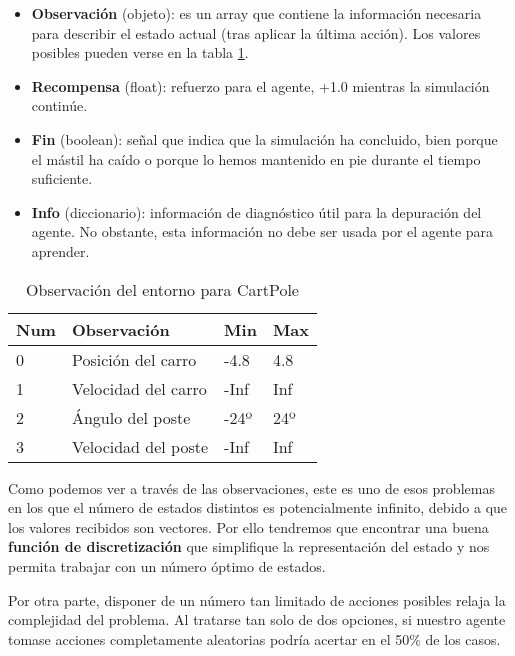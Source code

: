 \begin{itemize}
    \item \textbf{Observación} (objeto): es un array que contiene la información necesaria para describir el estado actual (tras aplicar la última acción). Los valores posibles pueden verse en la tabla \ref{obs-cartpole}.
    \item \textbf{Recompensa} (float): refuerzo para el agente, +1.0 mientras la simulación continúe.
    \item \textbf{Fin} (boolean): señal que indica que la simulación ha concluido, bien porque el mástil ha caído o porque lo hemos mantenido en pie durante el tiempo suficiente.
    \item \textbf{Info} (diccionario): información de diagnóstico útil para la depuración del agente. No obstante, esta información no debe ser usada por el agente para aprender.
\end{itemize}
\begin{table}[]
    \centering
    \begin{tabular}{|l|l|l|l|}
    \hline
    \textbf{Num} & \textbf{Observación} & \textbf{Min} & \textbf{Max} \\ \hline
    0            & Posición del carro   & -4.8         & 4.8          \\ \hline
    1            & Velocidad del carro  & -Inf         & Inf          \\ \hline
    2            & Ángulo del poste     & -24º         & 24º          \\ \hline
    3            & Velocidad del poste  & -Inf         & Inf          \\ \hline
    \end{tabular}
    \caption{Observación del entorno para CartPole}
    \label{obs-cartpole}
\end{table}

Como podemos ver a través de las observaciones, este es uno de esos problemas en los que el número de estados distintos es potencialmente infinito, debido a que los valores recibidos son vectores. Por ello tendremos que encontrar una buena \textbf{función de discretización} que simplifique la representación del estado y nos permita trabajar con un número óptimo de estados.

Por otra parte, disponer de un número tan limitado de acciones posibles relaja la complejidad del problema. Al tratarse tan solo de dos opciones, si nuestro agente tomase acciones completamente aleatorias podría acertar en el 50\% de los casos.

